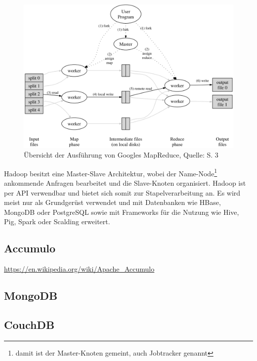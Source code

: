\begin{figure}[h]
\centering
\includegraphics[width=\textwidth]{Abbildungen/mapreduce.png}
\caption[Übersicht der Ausführung von Googles MapReduce]{Übersicht der Ausführung von Googles MapReduce, Quelle: \cite{paper:mapreduce} S. 3}
\label{fig:mapreduce}
\end{figure}

Hadoop besitzt eine Master-Slave Architektur, wobei der Name-Node\footnote{damit ist der Master-Knoten gemeint, auch Jobtracker genannt} ankommende Anfragen bearbeitet und die Slave-Knoten organisiert.
Hadoop ist per API verwendbar und bietet sich somit zur Stapelverarbeitung an. %
Es wird meist nur als Grundgerüst verwendet und mit Datenbanken wie HBase, MongoDB oder PostgreSQL sowie mit Frameworks für die Nutzung wie Hive, Pig, Spark oder Scalding erweitert.





\subsection{Accumulo}
\label{accumulo}
\url{https://en.wikipedia.org/wiki/Apache_Accumulo}

\subsection{MongoDB}

\subsection{CouchDB}

